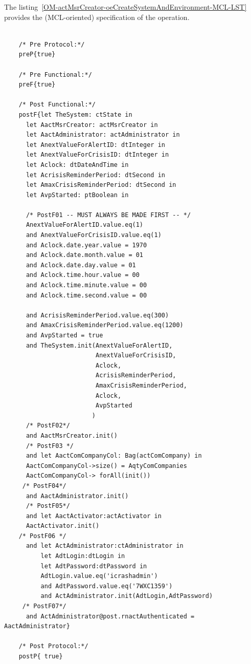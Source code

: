 \begin{operationmodel}
	\end{operationmodel}



	\vspace{1cm}
	The listing~\ref{OM-actMsrCreator-oeCreateSystemAndEnvironment-MCL-LST} provides the \msrmessir (MCL-oriented) specification of the operation.
	
	\scriptsize
	\vspace{0.5cm}
	\begin{lstlisting}[style=MessirStyle,firstnumber=auto,captionpos=b,caption={\msrmessir (MCL-oriented) specification of the operation \emph{oeCreateSystemAndEnvironment}.},label=OM-actMsrCreator-oeCreateSystemAndEnvironment-MCL-LST]

	/* Pre Protocol:*/ 
	preP{true}
	
	/* Pre Functional:*/
	preF{true}
	
	/* Post Functional:*/ 
	postF{let TheSystem: ctState in
	  let AactMsrCreator: actMsrCreator in
	  let AactAdministrator: actAdministrator in
	  let AnextValueForAlertID: dtInteger in
	  let AnextValueForCrisisID: dtInteger in
	  let Aclock: dtDateAndTime in
	  let AcrisisReminderPeriod: dtSecond in
	  let AmaxCrisisReminderPeriod: dtSecond in
	  let AvpStarted: ptBoolean in
	
	  /* PostF01 -- MUST ALWAYS BE MADE FIRST -- */ 
	  AnextValueForAlertID.value.eq(1)
	  and AnextValueForCrisisID.value.eq(1)
	  and Aclock.date.year.value = 1970 
	  and Aclock.date.month.value = 01
	  and Aclock.date.day.value = 01
	  and Aclock.time.hour.value = 00
	  and Aclock.time.minute.value = 00
	  and Aclock.time.second.value = 00
	
	  and AcrisisReminderPeriod.value.eq(300)
	  and AmaxCrisisReminderPeriod.value.eq(1200)
	  and AvpStarted = true
	  and TheSystem.init(AnextValueForAlertID,
	                     AnextValueForCrisisID,
	                     Aclock,
	                     AcrisisReminderPeriod,
	                     AmaxCrisisReminderPeriod,
	                     Aclock,
	                     AvpStarted
	                    )
	  /* PostF02*/ 
	  and AactMsrCreator.init()
	  /* PostF03 */ 
	  and let AactComCompanyCol: Bag(actComCompany) in
	  AactComCompanyCol->size() = AqtyComCompanies
	  AactComCompanyCol-> forAll(init())
	 /* PostF04*/ 
	  and AactAdministrator.init()
	  /* PostF05*/ 
	  and let AactActivator:actActivator in
	  AactActivator.init()
	/* PostF06 */ 
	  and let ActAdministrator:ctAdministrator in
	      let AdtLogin:dtLogin in
	      let AdtPassword:dtPassword in
	      AdtLogin.value.eq('icrashadmin')
	      and AdtPassword.value.eq('7WXC1359')
	      and ActAdministrator.init(AdtLogin,AdtPassword)
	 /* PostF07*/ 
	  and ActAdministrator@post.rnactAuthenticated = AactAdministrator}
	
	/* Post Protocol:*/ 
	postP{ true}
	
	\end{lstlisting}
